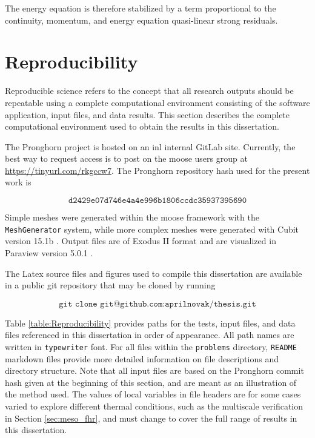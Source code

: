 \begin{appendices}
\noindent The energy equation is therefore stabilized by a term proportional to the continuity, momentum, and energy equation quasi-linear strong residuals. 

\clearpage
\chapter{Reproducibility}
\label{sec:reproducibility}

Reproducible science refers to the concept that all research outputs should be repeatable using a complete computational environment consisting of the software application, input files, and data results. This section describes the complete computational environment used to obtain the results in this dissertation.

The Pronghorn project is hosted on an \gls{inl} internal GitLab site. Currently, the best way to request access is to post on the \gls{moose} users group at \mbox{\url{https://tinyurl.com/rkgccw7}}. The Pronghorn repository hash used for the present work is

\begin{equation*}
\texttt{d2429e07d746e4a4e996b1806ccdc35937395690}
\end{equation*}

\noindent Simple meshes were generated within the \gls{moose} framework with the \texttt{MeshGenerator} system, while more complex meshes were generated with Cubit version 15.1b \cite{cubit}. Output files are of Exodus II format and are visualized in Paraview version 5.0.1 \cite{paraview}.

The Latex source files and figures used to compile this dissertation are available in a public git repository that may be cloned by running

\begin{equation*}
\texttt{git clone git@github.com:aprilnovak/thesis.git}
\end{equation*}

\noindent Table \ref{table:Reproducibility} provides paths for the tests, input files, and data files referenced in this dissertation in order of appearance. All path names are written in \texttt{typewriter} font. For all files within the \texttt{problems} directory, \texttt{README} markdown files provide more detailed information on file descriptions and directory structure. Note that all input files are based on the Pronghorn commit hash given at the beginning of this section, and are meant as an illustration of the method used. The values of local variables in file headers are for some cases varied to explore different thermal conditions, such as the multiscale verification in Section \ref{sec:meso_fhr}, and must change to cover the full range of results in this dissertation.


\end{appendices}

